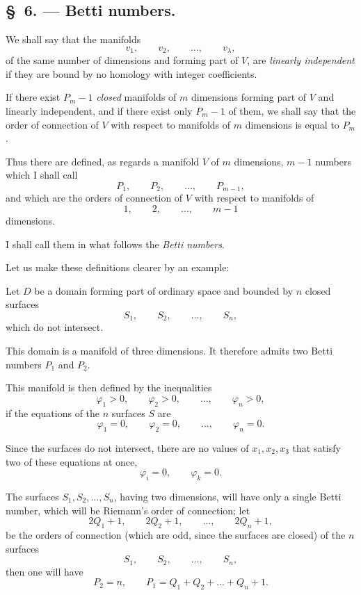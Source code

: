 \documentclass{article}
\begin{document}
\subsection*{\S~6. --- Betti numbers.}

We shall say that the manifolds
\[
v_{1}, \qquad v_{2}, \qquad \ldots, \qquad v_{\lambda},
\]
of the same number of dimensions and forming part of $V$, are \emph{linearly independent} if they are bound by no homology with integer coefficients.

If there exist $P_{m} - 1$ \emph{closed} manifolds of $m$ dimensions forming part of $V$ and linearly independent, and if there exist only $P_{m} - 1$ of them, we shall say that the order of connection of $V$ with respect to manifolds of $m$ dimensions is equal to $P_{m}$.

Thus there are defined, as regards a manifold $V$ of $m$ dimensions, $m - 1$ numbers which I shall call
\[
P_{1}, \qquad P_{2}, \qquad \ldots, \qquad P_{m-1},
\]
and which are the orders of connection of $V$ with respect to manifolds of
\[
1, \qquad 2, \qquad \ldots, \qquad m - 1
\]
dimensions.

I shall call them in what follows the \emph{Betti numbers}.

Let us make these definitions clearer by an example:

Let $D$ be a domain forming part of ordinary space and bounded by $n$ closed surfaces
\[
S_{1}, \qquad S_{2}, \qquad \ldots, \qquad S_{n},
\]
which do not intersect.

This domain is a manifold of three dimensions. It therefore admits two Betti numbers $P_{1}$ and $P_{2}$.

This manifold is then defined by the inequalities
\[
\varphi_{1} > 0, \qquad \varphi_{2} > 0, \qquad \ldots, \qquad \varphi_{n} > 0,
\]
if the equations of the $n$ surfaces $S$ are
\[
\varphi_{1} = 0, \qquad \varphi_{2} = 0, \qquad \ldots, \qquad \varphi_{n} = 0.
\]

Since the surfaces do not intersect, there are no values of $x_{1}, x_{2}, x_{3}$ that satisfy two of these equations at once,
\[
\varphi_{i} = 0, \qquad \varphi_{k} = 0.
\]

The surfaces $S_{1}, S_{2}, \ldots, S_{n}$, having two dimensions, will have only a single Betti number, which will be Riemann's order of connection; let
\[
2Q_{1} + 1, \qquad 2Q_{2} + 1, \qquad \ldots, \qquad 2Q_{n} + 1,
\]
be the orders of connection (which are odd, since the surfaces are closed) of the $n$ surfaces
\[
S_{1}, \qquad S_{2}, \qquad \ldots, \qquad S_{n},
\]
then one will have
\[
P_{2} = n, \qquad P_{1} = Q_{1} + Q_{2} + \ldots + Q_{n} + 1.
\]
\end{document}
